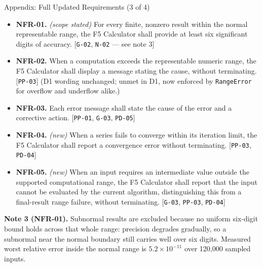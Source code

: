 \documentclass[11pt]{beamer}
\begin{document}
\begin{frame}{Appendix: Full Updated Requirements (3 of 4)}
  \scriptsize
  \begin{itemize}
    \item \textbf{NFR-01.} \emph{(scope stated)} For every finite, nonzero
          result within the normal representable range, the F5 Calculator
          shall provide at least six significant digits of accuracy.
          [\texttt{G-02}, \texttt{N-02} --- see note 3]
    \item \textbf{NFR-02.} When a computation exceeds the representable
          numeric range, the F5 Calculator shall display a message stating
          the cause, without terminating. [\texttt{PP-03}]
          (D1 wording unchanged; unmet in D1, now enforced by
          \texttt{RangeError} for overflow and underflow alike.)
    \item \textbf{NFR-03.} Each error message shall state the cause of the
          error and a corrective action.
          [\texttt{PP-01}, \texttt{G-03}, \texttt{PD-05}]
    \item \textbf{NFR-04.} \emph{(new)} When a series fails to converge within
          its iteration limit, the F5 Calculator shall report a convergence
          error without terminating. [\texttt{PP-03}, \texttt{PD-04}]
    \item \textbf{NFR-05.} \emph{(new)} When an input requires an
          intermediate value outside the supported computational range, the
          F5 Calculator shall report that the input cannot be evaluated by
          the current algorithm, distinguishing this from a final-result
          range failure, without terminating.
          [\texttt{G-03}, \texttt{PP-03}, \texttt{PD-04}]
  \end{itemize}
  \medskip
  \textbf{Note 3 (NFR-01).} Subnormal results are excluded because no
  uniform six-digit bound holds across that whole range: precision degrades
  gradually, so a subnormal near the normal boundary still carries well over
  six digits. Measured worst relative error inside the normal range is
  $5.2\times10^{-11}$ over 120{,}000 sampled inputs.
\end{frame}
\end{document}
